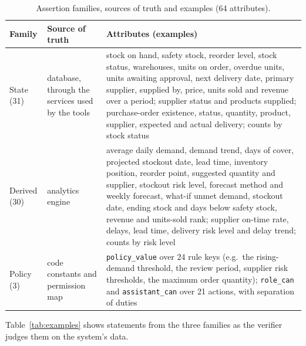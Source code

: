 \documentclass[journal]{IEEEtran}
\newcommand{\attr}[1]{\texttt{#1}}
\begin{document}
\begin{table}[t]
\centering\small
\caption{Assertion families, sources of truth and examples (64 attributes).}
\label{tab:families}
\begin{tabular}{@{}p{1.8cm}p{4.3cm}p{11.0cm}@{}}
\toprule
Family & Source of truth & Attributes (examples) \\
\midrule
State (31) & database, through the services used by the tools & stock on hand, safety stock, reorder level,
stock status, warehouses, units on order, overdue units, units awaiting approval, next delivery date,
primary supplier, supplied by, price, units sold and revenue over a period; supplier status and products
supplied; purchase-order existence, status, quantity, product, supplier, expected and actual delivery;
counts by stock status \\
Derived (30) & analytics engine & average daily demand, demand trend, days of cover, projected stockout
date, lead time, inventory position, reorder point, suggested quantity and supplier, stockout risk level,
forecast method and weekly forecast, what-if unmet demand, stockout date, ending stock and days below
safety stock, revenue and units-sold rank; supplier on-time rate, delays, lead time, delivery risk level
and delay trend; counts by risk level \\
Policy (3) & code constants and permission map & \attr{policy\_value} over 24 rule keys (e.g.\ the
rising-demand threshold, the review period, supplier risk thresholds, the maximum order quantity);
\attr{role\_can} and \attr{assistant\_can} over 21 actions, with separation of duties \\
\bottomrule
\end{tabular}
\end{table}

Table~\ref{tab:examples} shows statements from the three families as the verifier judges them on the
system's data.
\end{document}
